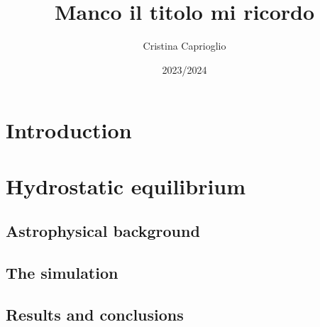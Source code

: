 \documentclass[]{article}
\title{Manco il titolo mi ricordo}
\author{Cristina Caprioglio}
\date{2023/2024 }
\begin{document}
\maketitle

\section{Introduction}

\section{Hydrostatic equilibrium}
\subsection{Astrophysical background}

\subsection{The simulation}
\subsection{Results and conclusions}
\end{document}
